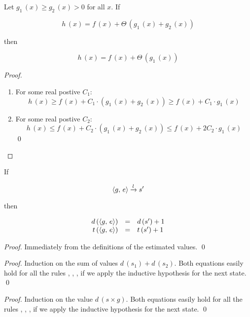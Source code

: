 \begin{lemma}
\label{lem:theta_absorb}
Let $g_1\,(x) \ge g_2\,(x) > 0$ for all $x$. If

\[ h\,(x) = f\,(x) + \Theta\,(g_1\,(x) + g_2\,(x)) \]

then

\[ h\,(x) = f\,(x) + \Theta\,(g_1\,(x)) \]

\end{lemma}
\begin{proof}
\begin{enumerate}
\item For some real  postive $C_1$: \[ h\,(x) \ge f\,(x) + C_1 \cdot (g_1\,(x) + g_2\,(x)) \ge f\,(x) + C_1 \cdot g_1\,(x) \]
\item For some real  postive $C_2$: \[ h\,(x) \le f\,(x) + C_2 \cdot (g_1\,(x) + g_2\,(x)) \le f\,(x) + 2 C_2 \cdot g_1\,(x) \]
\qed
\end{enumerate}
\end{proof}

\begin{lemma}
\label{lem:task_measure_equations}
  If

  \[\langle g ,\, e \rangle \xrightarrow{l} s^\prime\]

  then

  \[
    \begin{array}{rcl}
    d\,(\langle g ,\, e \rangle) &=& d\,(s^\prime) + 1\\
    t\,(\langle g ,\, e \rangle) &=& t\,(s^\prime) + 1
    \end{array}
  \]
\end{lemma}
\begin{proof}
    Immediately from the definitions of the estimated values.
    \qed
\end{proof}


\begin{proof}
Induction on the sum of values $d\,(s_1) + d\,(s_2)$. Both equations easily hold for all the rules , , ,  if we apply
the inductive hypothesis for the next state.
\qed
\end{proof}

\begin{proof}
Induction on the value $d\,(s \times g)$. Both equations easily hold for all the rules , , , 
if we apply the inductive hypothesis for the next state.
\qed
\end{proof}

